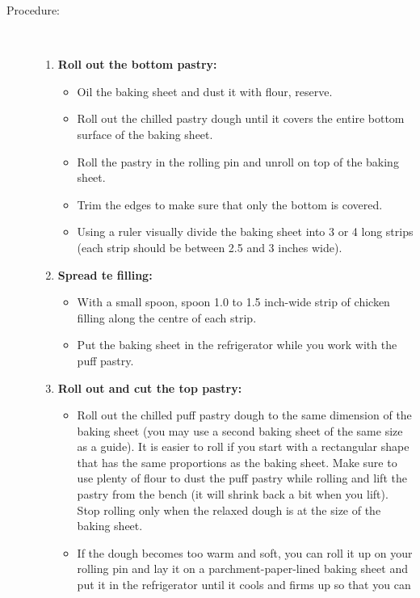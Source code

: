 \documentclass[11pt,letterpaper]{article}
\begin{document}
\begin{description}
\item[Procedure:]\ \\
\begin{enumerate}
\item{\bf Roll out the bottom pastry:}
       \begin{itemize}
        \item Oil the baking sheet and dust it with flour, reserve.
        \item Roll out the chilled pastry dough until it covers the
        entire bottom surface of the baking sheet.
        \item Roll the pastry in the rolling pin and unroll on top of
        the baking sheet.
        \item Trim the edges to make sure that only the bottom is covered.
        \item Using a ruler visually divide the baking sheet into 3
        or 4 long strips (each strip should be between 2.5 and 3 inches wide).
        \end{itemize}
\item{\bf Spread te filling:}    
       \begin{itemize}    
        \item With a small spoon, spoon 1.0 to 1.5 inch-wide strip of
        chicken filling along the centre of each strip.
        \item Put the baking sheet in the refrigerator while you work
        with the puff pastry.
        \end{itemize}
\item{\bf Roll out and cut the top pastry:}    
       \begin{itemize}            
        \item Roll out the chilled puff pastry dough to the same
        dimension of the baking sheet (you may use a second baking
        sheet of the same size as a guide). It is easier to roll if
        you start with a rectangular shape that has the same
        proportions as the baking sheet. Make sure to use plenty of
        flour to dust the puff pastry while rolling and lift the
        pastry from the bench (it will shrink back a bit when you
        lift). Stop rolling only when the relaxed dough is at the size
        of the baking sheet. 
        \item If the dough becomes too warm and soft,
        you can roll it up on your rolling pin and lay it on a
        parchment-paper-lined baking sheet and put it in the
        refrigerator until it cools and firms up so that you can

\end{itemize}
\end{enumerate}
\end{description}
\end{document}
